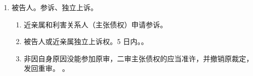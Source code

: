 \begin{enumerate}
\begin{enumerate}
          \item 审理中的程序转换。
                \begin{enumerate}
                  \item 人来了，没转公。终止审理 \yjt 转公诉。
                  \item 人没了，公转没收或缺席。裁定中止/终止审理 \yjt 满足缺席/没收 \yjt 提起缺席/没收程序。
                \end{enumerate}
          \item 救济。到案/没有到案 \yjt 提起公诉/再审纠正 \yjt 有错 \yjt 应当撤销原裁定，在判决中对涉案财产一并处理。
                。
          \item 为防止转移、销毁财产，可以查扣冻。
        \end{enumerate}
  \item 被告人。参诉、独立上诉。
        \begin{enumerate}
          \item 近亲属和利害关系人（主张债权）申请参诉。
          \item 被告人或近亲属独立上诉权。5 日内。。
          \item 非因自身原因没能参加原审，二审主张债权的应当准许，并撤销原裁定，发回重审。
                。
        \end{enumerate}
\end{enumerate}